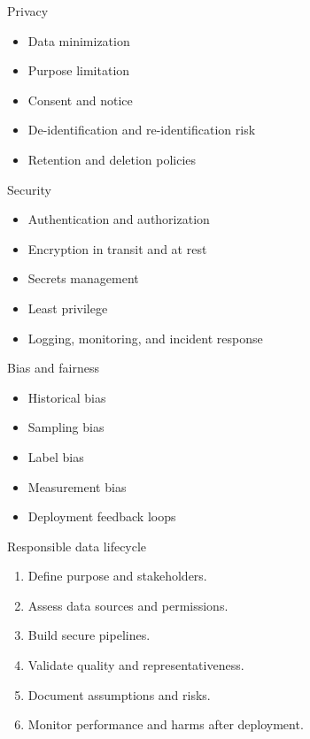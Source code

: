 \documentclass[aspectratio=43,12pt]{beamer}
\begin{document}
\begin{frame}{Privacy}
\begin{itemize}
  \item Data minimization
  \item Purpose limitation
  \item Consent and notice
  \item De-identification and re-identification risk
  \item Retention and deletion policies
\end{itemize}
\end{frame}

\begin{frame}{Security}
\begin{itemize}
  \item Authentication and authorization
  \item Encryption in transit and at rest
  \item Secrets management
  \item Least privilege
  \item Logging, monitoring, and incident response
\end{itemize}
\end{frame}

\begin{frame}{Bias and fairness}
\begin{itemize}
  \item Historical bias
  \item Sampling bias
  \item Label bias
  \item Measurement bias
  \item Deployment feedback loops
\end{itemize}
\end{frame}

\begin{frame}{Responsible data lifecycle}
\begin{enumerate}
  \item Define purpose and stakeholders.
  \item Assess data sources and permissions.
  \item Build secure pipelines.
  \item Validate quality and representativeness.
  \item Document assumptions and risks.
  \item Monitor performance and harms after deployment.
\end{enumerate}
\end{frame}
\end{document}
